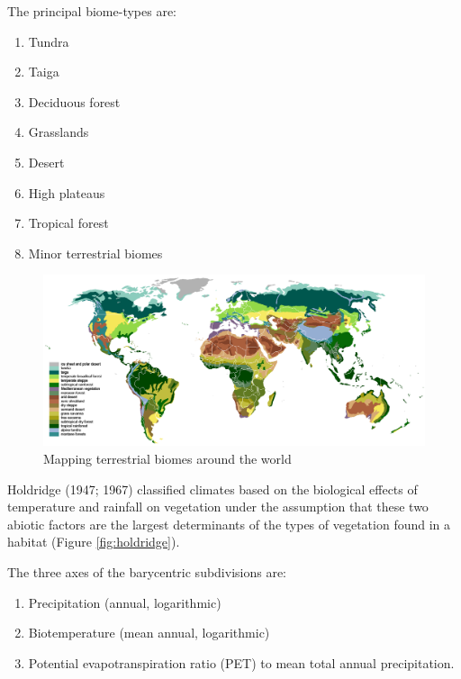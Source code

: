 \documentclass[]{book}
\providecommand{\tightlist}{%
  \setlength{\itemsep}{0pt}\setlength{\parskip}{0pt}}
\begin{document}
The principal biome-types are:

\begin{enumerate}
\def\labelenumi{\arabic{enumi}.}
\tightlist
\item
  Tundra
\item
  Taiga
\item
  Deciduous forest
\item
  Grasslands
\item
  Desert
\item
  High plateaus
\item
  Tropical forest
\item
  Minor terrestrial biomes
\end{enumerate}

\begin{figure}

{\centering \includegraphics[width=1\linewidth]{figures/biomes} 

}

\caption{Mapping terrestrial biomes around the world}\label{fig:biomes}
\end{figure}

Holdridge (1947; 1967) classified climates based on the biological
effects of temperature and rainfall on vegetation under the assumption
that these two abiotic factors are the largest determinants of the types
of vegetation found in a habitat (Figure \ref{fig:holdridge}).

The three axes of the barycentric subdivisions are:

\begin{enumerate}
\def\labelenumi{\arabic{enumi}.}
\tightlist
\item
  Precipitation (annual, logarithmic)
\item
  Biotemperature (mean annual, logarithmic)
\item
  Potential evapotranspiration ratio (PET) to mean total annual
  precipitation.
\end{enumerate}
\end{document}
